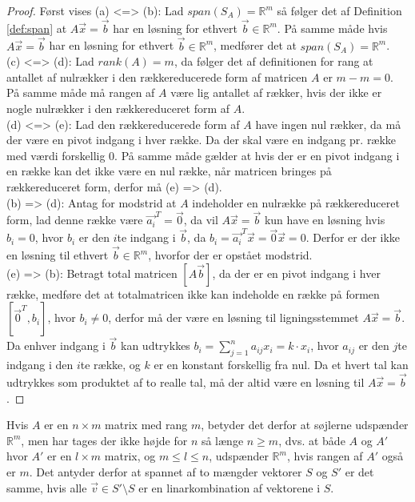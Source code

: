 \begin{proof}
Først vises (a) <=> (b):
Lad $span(S_A) = \mathds{R}^m$ så følger det af Definition \ref{def:span} at $A\vec{x}= \vec{b}$ har en løsning for ethvert $\vec{b} \in \mathds{R}^m$.
På samme måde hvis $A\vec{x}= \vec{b}$ har en løsning for ethvert $\vec{b} \in \mathds{R}^m$, medfører det at $span(S_A) = \mathds{R}^m$. 
\\(c) <=> (d): 
Lad $rank(A) = m$, da følger det af definitionen for rang at antallet af nulrækker i den rækkereducerede form af matricen $A$ er $m-m = 0$.
På samme måde må rangen af $A$ være lig antallet af rækker, hvis der ikke er nogle nulrækker i den rækkereduceret form af $A$.
\\(d) <=> (e):
Lad den rækkereducerede form af $A$ have ingen nul rækker, da må der være en pivot indgang i hver række. 
Da der skal være en indgang pr. række med værdi forskellig $0$. 
På samme måde gælder at hvis der er en pivot indgang i en række kan det ikke være en nul række, når matricen bringes på rækkereduceret form, derfor må (e) => (d).
\\(b) => (d):
Antag for modstrid at $A$ indeholder en nulrække på rækkereduceret form, lad denne række være $\vec{a_i}^T = \vec{0}$, da vil $A\vec{x} = \vec{b}$ kun have en løsning hvis $b_i=0$, hvor $b_i$ er den $i$te indgang i $\vec{b}$, da $b_i = \vec{a_i}^T \vec{x} = \vec{0} \vec{x} = 0$. 
Derfor er der ikke en løsning til ethvert $\vec{b} \in \mathds{R}^m$, hvorfor der er opstået modstrid.
\\(e) => (b): 
Betragt total matricen $[A \vec{b}]$, da der er en pivot indgang i hver række, medføre det at totalmatricen ikke kan indeholde en række på formen $[\vec{0}^T, b_i]$, hvor $b_i \neq 0$, derfor må der være en løsning til ligningsstemmet $A\vec{x} = \vec{b}$.
Da enhver indgang i $\vec{b}$ kan udtrykkes $b_i = \sum_{j=1}^n a_{ij} x_i = k \cdot x_i$, hvor $a_{ij}$ er den $j$te indgang i den $i$te række, og $k$ er en konstant forskellig fra nul.
Da et hvert tal kan udtrykkes som produktet af to realle tal, må der altid være en løsning til $A\vec{x}=\vec{b}$.
\end{proof}
Hvis $A$ er en $n \times m$ matrix med rang $m$, betyder det derfor at søjlerne udspænder $\mathds{R}^m$, men har tages der ikke højde for $n$ så længe $n \geq m$, dvs. at både $A$ og $A'$ hvor $A'$ er en $l \times m$ matrix, og $m \leq l \leq n$, udspænder $\mathds{R}^m$, hvis rangen af $A'$ også er $m$. 
Det antyder derfor at spannet af to mængder vektorer $S$ og $S'$ er det samme, hvis alle $\vec{v} \in S'\setminus S$ er en linarkombination af vektorene i $S$.

